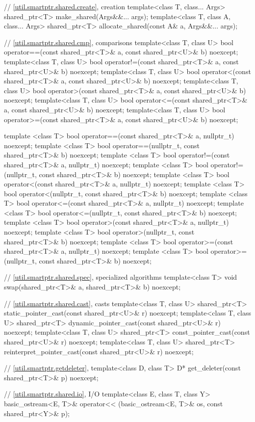 \begin{codeblock}
{  // \ref{util.smartptr.shared.create},  creation
  template<class T, class... Args>
    shared_ptr<T> make_shared(Args&&... args);
  template<class T, class A, class... Args>
    shared_ptr<T> allocate_shared(const A& a, Args&&... args);

  // \ref{util.smartptr.shared.cmp},  comparisons
  template<class T, class U>
    bool operator==(const shared_ptr<T>& a, const shared_ptr<U>& b) noexcept;
  template<class T, class U>
    bool operator!=(const shared_ptr<T>& a, const shared_ptr<U>& b) noexcept;
  template<class T, class U>
    bool operator<(const shared_ptr<T>& a, const shared_ptr<U>& b) noexcept;
  template<class T, class U>
    bool operator>(const shared_ptr<T>& a, const shared_ptr<U>& b) noexcept;
  template<class T, class U>
    bool operator<=(const shared_ptr<T>& a, const shared_ptr<U>& b) noexcept;
  template<class T, class U>
    bool operator>=(const shared_ptr<T>& a, const shared_ptr<U>& b) noexcept;

  template <class T>
    bool operator==(const shared_ptr<T>& a, nullptr_t) noexcept;
  template <class T>
    bool operator==(nullptr_t, const shared_ptr<T>& b) noexcept;
  template <class T>
    bool operator!=(const shared_ptr<T>& a, nullptr_t) noexcept;
  template <class T>
    bool operator!=(nullptr_t, const shared_ptr<T>& b) noexcept;
  template <class T>
    bool operator<(const shared_ptr<T>& a, nullptr_t) noexcept;
  template <class T>
    bool operator<(nullptr_t, const shared_ptr<T>& b) noexcept;
  template <class T>
    bool operator<=(const shared_ptr<T>& a, nullptr_t) noexcept;
  template <class T>
    bool operator<=(nullptr_t, const shared_ptr<T>& b) noexcept;
  template <class T>
    bool operator>(const shared_ptr<T>& a, nullptr_t) noexcept;
  template <class T>
    bool operator>(nullptr_t, const shared_ptr<T>& b) noexcept;
  template <class T>
    bool operator>=(const shared_ptr<T>& a, nullptr_t) noexcept;
  template <class T>
    bool operator>=(nullptr_t, const shared_ptr<T>& b) noexcept;

  // \ref{util.smartptr.shared.spec},  specialized algorithms
  template<class T>
    void swap(shared_ptr<T>& a, shared_ptr<T>& b) noexcept;

  // \ref{util.smartptr.shared.cast},  casts
  template<class T, class U>
    shared_ptr<T> static_pointer_cast(const shared_ptr<U>& r) noexcept;
  template<class T, class U>
    shared_ptr<T> dynamic_pointer_cast(const shared_ptr<U>& r) noexcept;
  template<class T, class U>
    shared_ptr<T> const_pointer_cast(const shared_ptr<U>& r) noexcept;
  template<class T, class U>
    shared_ptr<T> reinterpret_pointer_cast(const shared_ptr<U>& r) noexcept;

  // \ref{util.smartptr.getdeleter},  
  template<class D, class T>
    D* get_deleter(const shared_ptr<T>& p) noexcept;

  // \ref{util.smartptr.shared.io},  I/O
  template<class E, class T, class Y>
    basic_ostream<E, T>& operator<< (basic_ostream<E, T>& os, const shared_ptr<Y>& p);
}
\end{codeblock}

